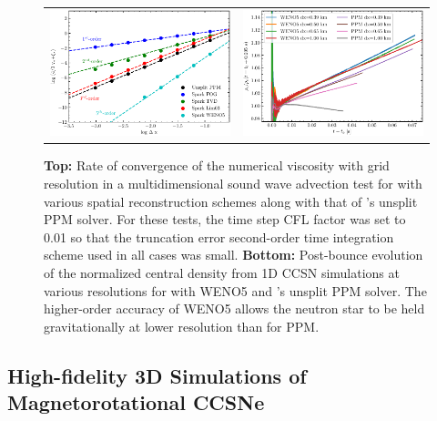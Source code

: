 \begin{figure}
  \begin{tabular}{cc}
    \includegraphics[width=3.12in]{figs/convergence} &
    \includegraphics[width=3.12in]{figs/centralDens}
  \end{tabular}
  \caption{{\bf Top:} Rate of convergence of the numerical viscosity with grid resolution in a multidimensional sound wave advection test for \spark with various spatial reconstruction schemes along with that of \flash's unsplit PPM solver. For these tests, the time step CFL factor was set to 0.01 so that the truncation error second-order time integration scheme used in all cases was small. {\bf Bottom:} Post-bounce evolution of the normalized central density from 1D CCSN simulations at various resolutions for \spark with WENO5 and \flash's unsplit PPM solver.  The higher-order accuracy of WENO5 allows the neutron star to be held gravitationally at lower resolution than for PPM.}
  \label{fig:converge}
\end{figure}

\vspace{0.1in} 

\subsection{High-fidelity 3D Simulations of Magnetorotational CCSNe}
\label{sec:Y1mrccsn}

